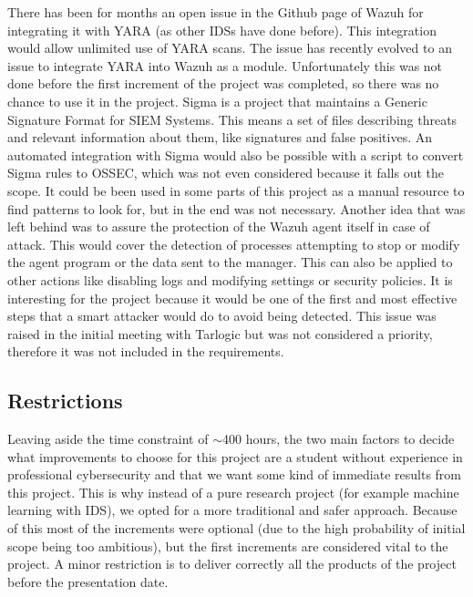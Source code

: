 \linej
There has been for months an open issue in the Github page of Wazuh for integrating it with YARA (as other IDSs have done before).
This integration would allow unlimited use of YARA scans.
The issue has recently evolved to an issue to integrate YARA into Wazuh as a module\cite{yara_module}.
Unfortunately this was not done before the first increment of the project was completed, so there was no chance to use it in the project.
\linej
\linej
Sigma\cite{sigma} is a project that maintains a Generic Signature Format for SIEM Systems. This means a set of files describing threats and relevant information about them, like signatures and false positives. An automated integration with Sigma would also be possible with a script to convert Sigma rules to OSSEC, which was not even considered because it falls out the scope. It could be been used in some parts of this project as a manual resource to find patterns to look for, but in the end was not necessary.
\linej
\linej
Another idea that was left behind was to assure the protection of the Wazuh agent itself in case of attack. This would cover the detection of processes attempting to stop or modify the agent program or the data sent to the manager. This can also be applied to other actions like disabling logs and modifying settings or security policies. It is interesting for the project because it would be one of the first and most effective steps that a smart attacker would do to avoid being detected.
This issue was raised in the initial meeting with Tarlogic but was not considered a priority, therefore it was not included in the requirements.

\subsection{Restrictions}
Leaving aside the time constraint of $\sim$400 hours, the two main factors to decide what improvements to choose for this project are a student without experience in professional cybersecurity and that we want some kind of immediate results from this project.
This is why instead of a pure research project (for example machine learning with IDS), we opted for a more traditional and safer approach.
Because of this most of the increments were optional (due to the high probability of initial scope being too ambitious), but the first increments are considered vital to the project.
\linej
\linej
A minor restriction is to deliver correctly all the products of the project before the presentation date.

